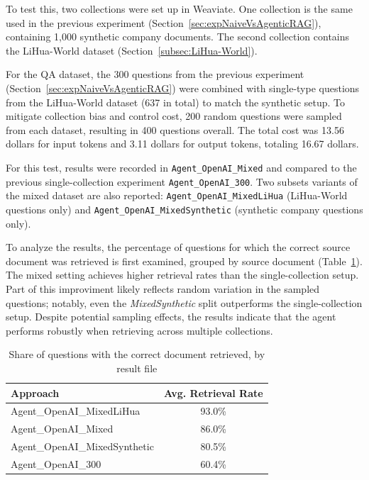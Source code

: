 To test this, two collections were set up in Weaviate. One collection is the same used in the previous experiment (Section~\ref{sec:expNaiveVsAgenticRAG}), containing 1,000 synthetic company documents. The second collection contains the LiHua-World dataset (Section~\ref{subsec:LiHua-World}).

For the \gls{QA} dataset, the 300 questions from the previous experiment (Section~\ref{sec:expNaiveVsAgenticRAG}) were combined with single-type questions from the LiHua-World dataset (637 in total) to match the synthetic setup. To mitigate collection bias and control cost, 200 random questions were sampled from each dataset, resulting in 400 questions overall. The total cost was 13.56 dollars for input tokens and 3.11 dollars for output tokens, totaling 16.67 dollars.

For this test, results were recorded in \texttt{Agent\_OpenAI\_Mixed} and compared to the previous single-collection experiment \texttt{Agent\_OpenAI\_300}. Two subsets variants of the mixed dataset are also reported: \texttt{Agent\_OpenAI\_MixedLiHua} (LiHua-World questions only) and \texttt{Agent\_OpenAI\_MixedSynthetic} (synthetic company questions only).

To analyze the results, the percentage of questions for which the correct source document was retrieved is first examined, grouped by source document (Table~\ref{tab:doc-retrieved-by-source-mixed}). The mixed setting achieves higher retrieval rates than the single-collection setup. Part of this improviment likely reflects random variation in the sampled questions; notably, even the \emph{MixedSynthetic} split outperforms the single-collection setup. Despite potential sampling effects, the results indicate that the agent performs robustly when retrieving across multiple collections.
\begin{table}[htbp]
    \centering
    \begin{tabular}{l c}
        \hline
        Approach & Avg. Retrieval Rate \\
        \hline
    Agent\_OpenAI\_MixedLiHua & 93.0\% \\
    Agent\_OpenAI\_Mixed & 86.0\% \\
    Agent\_OpenAI\_MixedSynthetic & 80.5\% \\
    Agent\_OpenAI\_300 & 60.4\% \\
        \hline
    \end{tabular}
    \caption{Share of questions with the correct document retrieved, by result file}\label{tab:doc-retrieved-by-source-mixed}
\end{table}

